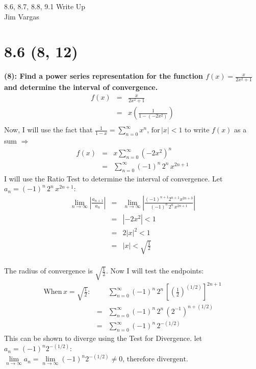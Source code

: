 \documentclass[12]{article}
\begin{document}
\begin{flushright}
8.6, 8.7, 8.8, 9.1 Write Up\\
Jim Vargas
\end{flushright}

\section{8.6 (8, 12)}
\textbf{(8): Find a power series representation for the function 
$\displaystyle{
f(x)=\frac{x}{2x^2+1}
}$ 
and determine the interval of convergence.
}
\begin{eqnarray}
f(x) &=& \frac{x}{2x^2+1}\\
&=& x\left(\frac{1}{1-(-2x^2)}\right)\\
\end{eqnarray}
Now, I will use the fact that
$\displaystyle{
\frac{1}{1-x} = \sum\limits_{n=0}^\infty x^n,\, \mathrm{for}\, |x|<1
}$
to write $f(x)$ as a sum $\Rightarrow$
\begin{eqnarray}
f(x) &=& x\sum\limits_{n=0}^\infty (-2x^2)^n\\
&=& \sum\limits_{n=0}^\infty (-1)^n\,2^n\,x^{2n+1}
\end{eqnarray}
I will use the Ratio Test to determine the interval of convergence. Let $a_n = (-1)^n\,2^n\,x^{2n+1}$:\\
\begin{eqnarray}
\lim\limits_{n\to\infty} \left|\frac{a_{n+1}}{a_n}\right| &=& \lim\limits_{n\to\infty} \left|\frac{(-1)^{n+1}2^{n+1}x^{2n+3}}{(-1)^n\,2^n\,x^{2n+1}}\right|\\
&=& |-2x^2| < 1\\
&=& 2|x|^2 < 1\\
&=& |x| < \sqrt{\frac{1}{2}}
\end{eqnarray}\\
The radius of convergence is $\sqrt{\frac{1}{2}}$. Now I will test the endpoints:
\begin{eqnarray}
\mathrm{When}\, x=\sqrt{\frac{1}{2}}\mathrm{:}&&\sum\limits_{n=0}^\infty (-1)^n\, 2^n\, \left[\left(\frac{1}{2}\right)^{(1/2)}\right]^{2n+1}\\
&=& \sum\limits_{n=0}^\infty (-1)^n\, 2^n\, (2^{-1})^{n+(1/2)}\\
&=& \sum\limits_{n=0}^\infty (-1)^n\, 2^{-(1/2)}
\end{eqnarray}
This can be shown to diverge using the Test for Divergence. let $a_n = (-1)^n 2^{-(1/2)}$:\\
$\displaystyle{
\lim\limits_{n\to\infty} a_n = \lim\limits_{n\to\infty} (-1)^n 2^{-(1/2)} \neq 0\mathrm{,\, therefore\,\, divergent.}
}$
\end{document}
